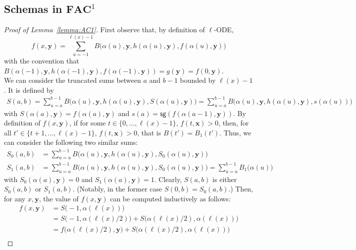 \documentclass[11pt, oneside]{article}
\newcommand{\fun}[1]{\mathsf{#1}}
\newcommand{\AC}{\mathbf{FAC}}
\newcommand{\tu}[1]{\mathbf{#1}}
\theoremstyle{definition}
\begin{document}
\begin{toappendix}
\subsection{Schemas in $\AC^1$}\label{appendix:AC}
\begin{proof}[Proof of Lemma~\ref{lemma:AC1}]
First observe that, by definition of $\ell$-ODE, 
    $$
    f(x, \tu y) = \sum^{\ell(x)-1}_{u=-1} B\big(\alpha(u), \tu y, h(\alpha(u), \tu y), f(\alpha(u), \tu y)\big)
    $$
    with the convention that $B(\alpha(-1), \tu y, h(\alpha(-1), \tu y), f(\alpha(-1), \tu y))=g(\tu y)=f(0, \tu y)$.
    \\
    We can consider the truncated sums between $a$ and $b-1$ bounded by $\ell(x)-1$.
    It is defined by
    \begin{align*}
        S(a,b) = \sum^{b-1}_{u=a} B\big(\alpha(u), \tu y, h(\alpha(u), \tu y), S(\alpha(u), \tu y)\big) 
        = \sum^{b-1}_{u=a} B\big(\alpha(u), \tu y, h(\alpha(u), \tu y), s(\alpha(u))\big)
    \end{align*}
    with $S(\alpha(a), \tu y) = f(\alpha(a), \tu y)$ and $s(a)=\fun{sg}(f(\alpha(a-1), \tu y))$.
    By definition of $f(x, \tu y)$, if for some $t\in \{0, \dots, \ell(x)-1\}$, $f(t, \tu x)>0$, then, for all $t'\in \{t+1, \dots, \ell(x)-1\}$, $f(t, \tu x)>0$, that is $B(t')=B_1(t')$.
    Thus, we can consider the following two similar sums:
    \begin{align*}
        S_0(a,b) &= \sum^{b-1}_{u=a} B\big(\alpha(u), \tu y, h(\alpha(u), \tu y), S_0(\alpha(u), \tu y)\big) \\
        S_1(a,b) &= \sum^{b-1}_{u=a} B\big(\alpha(u), \tu y, h(\alpha(u), \tu y), S_0(\alpha(u), \tu y)\big) = \sum^{b-1}_{u=a} B_1\big(\alpha(u)\big)
    \end{align*}
    with $S_0(\alpha(a), \tu y)=0$ and $S_1(\alpha(a), \tu y)=1$.
    Clearly, $S(a,b)$ is either $S_0(a,b)$ or $S_1(a, b)$. 
    (Notably, in the former case $S(0, b)=S_0(a,b)$.)
    Then, for any $x, \tu y$, the value of $f(x, \tu y)$ can be computed inductively as follows:
    \begin{align*}
        f(x, \tu y) &= S\big(-1, \alpha(\ell(x))\big) \\
        &= S\big(-1, \alpha(\ell(x)/2)\big) + S\big(\alpha(\ell(x)/2), \alpha(\ell(x))\big) \\
        &= f\big(\alpha(\ell(x)/2), \tu y\big) + S\big(\alpha(\ell(x)/2), \alpha(\ell(x))\big) \\

\end{align*}
\end{proof}
\end{toappendix}
\end{document}
